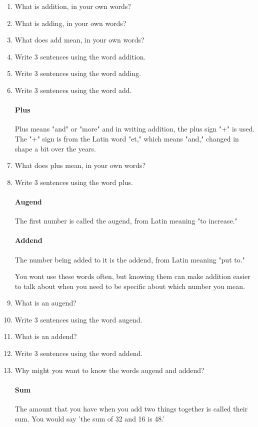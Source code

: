 \documentclass[12pt]{article}
\begin{document}
\begin{enumerate}

\item What is addition, in your own words?
\item What is adding, in your own words?
\item What does add mean, in your own words?
\item Write 3 sentences using the word addition.
\item Write 3 sentences using the word adding.
\item Write 3 sentences using the word add.

\paragraph{Plus}
Plus means "and"  or "more" and in writing addition, the plus sign "+" is used. The "+" sign is from the Latin word "et," which means "and," changed in shape a bit over the years.\\

\item What does plus mean, in your own words?
\item Write 3 sentences using the word plus.

\paragraph{Augend}
The first number is called the augend, from Latin meaning "to increase."

\paragraph{Addend}
The number being added to it is the addend, from Latin meaning "put to."

You wont use these words often, but knowing them can make addition easier to talk about when you need to be specific about which number you mean.\\

\item What is an augend?
\item Write 3 sentences using the word augend.
\item What is an addend?
\item Write 3 sentences using the word addend.
\item Why might you want to know the words augend and addend?

\paragraph{Sum} The amount that you have when you add two things together is called their sum. You would say 'the sum of 32 and 16 is 48.'


\end{enumerate}
\end{document}
